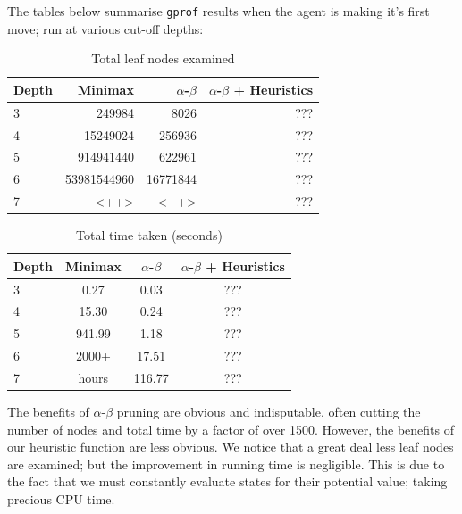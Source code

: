 \documentclass[10pt,twocolumn]{article}
\begin{document}
The tables below summarise \texttt{gprof} results when the agent is making it's first move;
run at various cut-off depths:
\begin{table}[H]
  \centering
  \caption{Total leaf nodes examined}
  \begin{tabular}{lrrr}
    \toprule
    Depth & Minimax & $\alpha$-$\beta$ & $\alpha$-$\beta$ + Heuristics \\
    \midrule
    3 & 249984 & 8026 & ??? \\
    4 & 15249024 & 256936 & ??? \\
    5 & 914941440 & 622961 & ??? \\
    6 & 53981544960 & 16771844 & ??? \\
    7 & <++> & <++> & ??? \\
    \bottomrule
  \end{tabular}
  \label{tab:leafnodes}
\end{table}
\begin{table}[h]
  \centering
  \caption{Total time taken (seconds)}
  \begin{tabular}{lccc}
    \toprule
    Depth & Minimax & $\alpha$-$\beta$ & $\alpha$-$\beta$ + Heuristics \\
    \midrule
    3 & 0.27 & 0.03 & ??? \\
    4 & 15.30 & 0.24 & ??? \\
    5 & 941.99 & 1.18 & ??? \\
    6 & 2000+ & 17.51 & ??? \\
    7 & hours & 116.77 & ??? \\
    \bottomrule
  \end{tabular}
  \label{tab:time}
\end{table}

The benefits of $\alpha$-$\beta$ pruning are obvious and indisputable, often cutting
the number of nodes and total time by a factor of over 1500.
However, the benefits of our heuristic function are less obvious. We notice that
a great deal less leaf nodes are examined; but the improvement in running time is
negligible. This is due to the fact that we must constantly evaluate states for their
potential value; taking precious CPU time.
\end{document}
